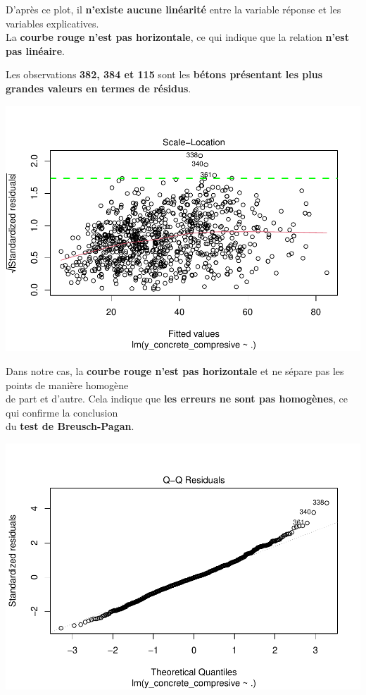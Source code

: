 \documentclass[
  12pt,
]{article}
\begin{document}
D'après ce plot, il \textbf{n'existe aucune linéarité} entre la variable
réponse et les variables explicatives.\\
La \textbf{courbe rouge n'est pas horizontale}, ce qui indique que la
relation \textbf{n'est pas linéaire}.

Les observations \textbf{382, 384 et 115} sont les \textbf{bétons
présentant les plus grandes valeurs en termes de résidus}.

\includegraphics{rmd_final_files/figure-latex/unnamed-chunk-19-1.pdf}

Dans notre cas, la \textbf{courbe rouge n'est pas horizontale} et ne
sépare pas les points de manière homogène\\
de part et d'autre. Cela indique que \textbf{les erreurs ne sont pas
homogènes}, ce qui confirme la conclusion\\
du \textbf{test de Breusch-Pagan}.

\includegraphics{rmd_final_files/figure-latex/unnamed-chunk-20-1.pdf}
\end{document}
